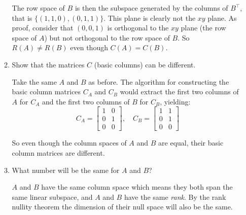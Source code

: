 \documentclass{scrartcl}
\begin{document}
\begin{enumerate}
\begin{enumerate}
The row space of $B$ is then the subspace generated by the columns of $B^\top$, that is $\{(1, 1, 0), (0, 1, 1)\}$. This plane is clearly not the $xy$ plane. As proof, consider that $(0, 0, 1)$ is orthogonal to the $xy$ plane (the row space of $A$) but not orthogonal to the row space of $B$. So $R(A) \neq R(B)$ even though $C(A) = C(B)$.

\item Show that the matrices $C$ (basic columns) can be different. 

Take the same $A$ and $B$ as before. The algorithm for constructing the basic column matrices $C_A$ and $C_B$ would extract the first two columns of $A$ for $C_A$ and the first two columns of $B$ for $C_B$, yielding:
$$C_A = \begin{bmatrix}
	1 & 0 \\ 0 & 1 \\ 0 & 0
\end{bmatrix}, \quad
C_B = \begin{bmatrix}
	1 & 1 \\ 0 & 1 \\ 0 & 0
\end{bmatrix}$$

So even though the column spaces of $A$ and $B$ are equal, their basic column matrices are different.

\item What number will be the same for $A$ and $B$?

$A$ and $B$ have the same column space which means they both span the same linear subspace, and $A$ and $B$ have the same \emph{rank}. By the rank nullity theorem the dimension of their null space will also be the same.

\end{enumerate}
\end{enumerate}
\end{document}
